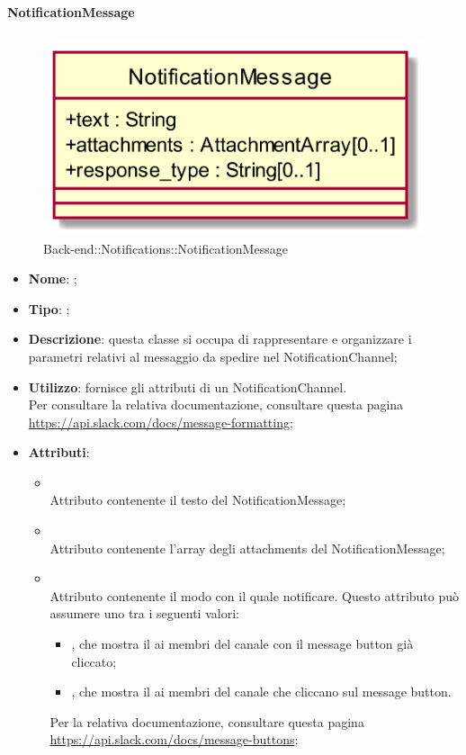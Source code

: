 \hypertarget{NotificationMessage_label}{\paragraph{NotificationMessage}}
\begin{figure}[h]
	\centering
	\includegraphics[width=\textwidth,height=\textheight,keepaspectratio]{images/ClassNotificationMessage.png}
	\caption{Back-end::Notifications::NotificationMessage}
\end{figure}
\begin{itemize}
	\item \textbf{Nome}: ;
	\item \textbf{Tipo}: ;
	\item \textbf{Descrizione}: questa classe si occupa di rappresentare e organizzare i parametri relativi al messaggio da spedire nel NotificationChannel;
	\item \textbf{Utilizzo}: fornisce gli attributi di un NotificationChannel. \\ Per consultare la relativa documentazione, consultare questa pagina \url{https://api.slack.com/docs/message-formatting};
	\item \textbf{Attributi}:
	\begin{itemize}
		\item[]  \\
		Attributo contenente il testo del NotificationMessage;
		\item[]  \\
		Attributo contenente l'array degli attachments del NotificationMessage;
		\item[]  \\
		Attributo contenente il modo con il quale notificare.
Questo attributo può assumere uno tra i seguenti valori:
\begin{itemize}
\item {}, che mostra il  ai membri del canale con il message button già cliccato;
\item {}, che mostra il  ai membri del canale che cliccano sul message button.
\end{itemize}
Per la relativa documentazione, consultare questa pagina \url{https://api.slack.com/docs/message-buttons};
	\end{itemize}
\end{itemize}

